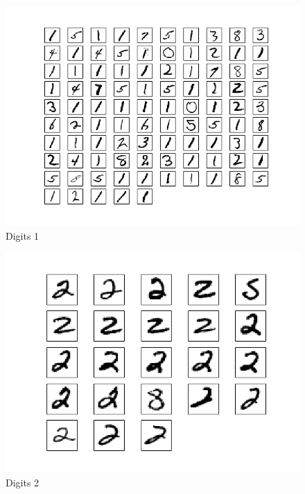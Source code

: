 \documentclass[10pt]{article}
\begin{document}
\begin{figure}
\begin{center}
\includegraphics[scale=0.5]{medoidsA1}
\caption{Digits 1}
\end{center}
\end{figure}
\begin{figure}
\begin{center}
\includegraphics[scale=0.5]{medoidsA2}
\caption{Digits 2}
\end{center}
\end{figure}
\end{document}
